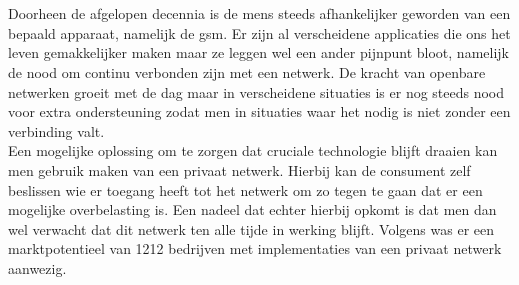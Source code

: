 
\chapter{}%
\label{ch:inleiding}

Doorheen de afgelopen decennia is de mens steeds afhankelijker geworden van een bepaald apparaat, namelijk de gsm. Er zijn al verscheidene applicaties die ons het leven gemakkelijker maken maar ze leggen wel een ander pijnpunt bloot, namelijk de nood om continu verbonden zijn met een netwerk. De kracht van openbare netwerken groeit met de dag maar in verscheidene situaties is er nog steeds nood voor extra ondersteuning zodat men in situaties waar het nodig is niet zonder een verbinding valt. \\

Een mogelijke oplossing om te zorgen dat cruciale technologie blijft draaien kan men gebruik maken van een privaat netwerk. Hierbij kan de consument zelf beslissen wie er toegang heeft tot het netwerk om zo tegen te gaan dat er een mogelijke overbelasting is. Een nadeel dat echter hierbij opkomt is dat men dan wel verwacht dat dit netwerk ten alle tijde in werking blijft. Volgens \textcite{Dux2023} was er een marktpotentieel van 1212 bedrijven met implementaties van een privaat netwerk aanwezig. 
\section{}%
\label{sec:probleemstelling}


